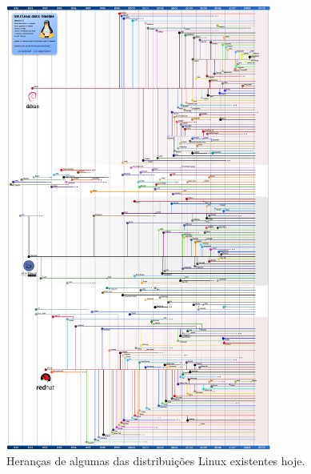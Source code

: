 \begin{anexosenv}
\begin{figure}[h]
  \centering
	\includegraphics[width=0.78\textwidth]{figuras/linux-timeline-heranca}
  \caption*{Heranças de algumas das distribuições Linux existentes hoje\protect\footnotemark.}
  \label{fig:figuras_linux_timeline_heranca}
\end{figure}


\end{anexosenv}

